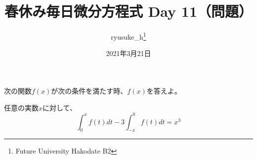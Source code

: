 \documentclass[a4j]{jsarticle}
\title{春休み毎日微分方程式 Day 11（問題）}
\author{ryusuke\_h\thanks{Future University Hakodate B2}}
\date{2021年3月21日}
\begin{document}
\begin{spacing}{1.6}
\maketitle

次の関数$f(x)$が次の条件を満たす時、$f(x)$を答えよ。\\
\begin{qparts}
  \qpart 任意の実数$x$に対して、
  \begin{equation*}
    \int_0^x f(t)dt - 3\int_{-x}^0 f(t)dt = x^3
  \end{equation*}
  \end{qparts}
\end{spacing}
\end{document}
